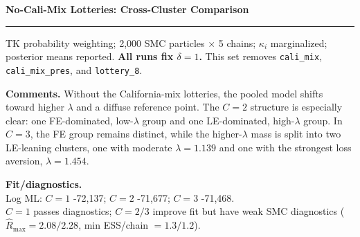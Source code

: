 \documentclass[10pt]{article}
\newcommand{\slidetitle}[1]{%
  {\Large\bfseries #1}\par\vspace{0.20em}
  \textcolor{black!35}{\rule{\textwidth}{0.45pt}}\vspace{0.25em}
}
\begin{document}
\newpage

\slidetitle{No-Cali-Mix Lotteries: Cross-Cluster Comparison}

{\scriptsize
TK probability weighting; 2,000 SMC particles $\times$ 5 chains; $\kappa_i$
marginalized; posterior means reported. \textbf{All runs fix $\delta=1$.}
This set removes \texttt{cali\_mix}, \texttt{cali\_mix\_pres}, and \texttt{lottery\_8}.
}

\vspace{0.20em}
\centering
{}

\vspace{0.35em}
\begin{minipage}[t]{0.72\textwidth}
\scriptsize
\textbf{Comments.}
Without the California-mix lotteries, the pooled model shifts toward higher
$\lambda$ and a diffuse reference point. The $C=2$ structure is especially
clear: one FE-dominated, low-$\lambda$ group and one LE-dominated, high-$\lambda$
group. In $C=3$, the FE group remains distinct, while the higher-$\lambda$
mass is split into two LE-leaning clusters, one with moderate $\lambda=1.139$
and one with the strongest loss aversion, $\lambda=1.454$.
\end{minipage}
\hfill
\begin{minipage}[t]{0.25\textwidth}
\scriptsize
\textbf{Fit/diagnostics.}\\
Log ML: $C=1$ -72,137; $C=2$ -71,677; $C=3$ -71,468.\\
$C=1$ passes diagnostics; $C=2/3$ improve fit but have weak SMC diagnostics
($\hat R_{\max}=2.08/2.28$, min ESS/chain $=1.3/1.2$).
\end{minipage}
\end{document}
